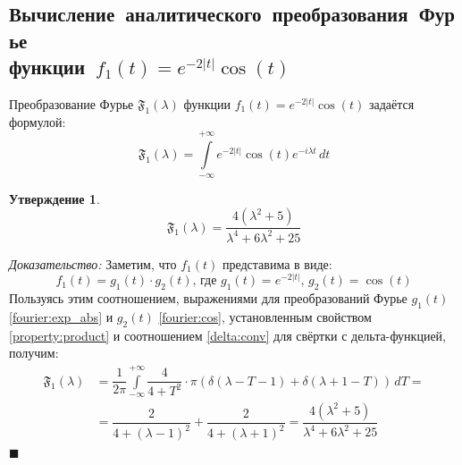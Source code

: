 \documentclass[11pt, oneside, final]{article}
\theoremstyle{break}
\numberwithin{equation}{section}
\theoremstyle{plain}
\newtheorem*{statement}{Утверждение}
\theoremstyle{definition}
\renewenvironment{proof}{
\noindent\textit{Доказательство: }} {\qed}
\newcommand \intinf[1][{\,dt}]{ \int\limits_{-\infty}^{+\infty}{{#1}}}
\renewcommand \qed{$\blacksquare$}
\begin{document}
   \clearpage
       \subsection{Вычисление~аналитического~преобразования~Фурье\\функции~\(f_1(t) = e^{-2|t|} \cos(t)\)}

       Преобразование Фурье \( \mathfrak{F_1} (\lambda)\) функции \(f_1(t) = e^{-2|t|} \cos(t) \) задаётся формулой:
       \[ \mathfrak{F_1} (\lambda) = \intinf[{e^{-2|t|} \cos(t) e^{-i\lambda t}\, dt}] \]
       \begin{statement}
           \begin{equation}\label{eq:fourier:f1} 
               \boxed{ \mathfrak{F_1}(\lambda) = \dfrac{4(\lambda^2 + 5)}{\lambda^4 + 6\lambda^2 + 25} } 
           \end{equation}
       \end{statement}
       \begin{proof}
           Заметим, что \(f_1(t) \) представима в виде: 
           \begin{equation}\label{factor:f1} 
               f_1(t) = g_1(t) \cdot g_2(t) \text{, где }g_1(t) = e^{-2|t|},\,g_2(t) = \cos(t) 
           \end{equation}
           Пользуясь этим соотношением, выражениями для преобразований Фурье \(g_1(t)\) \eqref{fourier:exp_abs} и \(g_2(t)\) \eqref{fourier:cos}, установленным свойством \ref{property:product} и соотношением \eqref{delta:conv} для свёртки с дельта-функцией, получим:
           \[ 
           \begin{split}
               \mathfrak{F_1} (\lambda) &= \dfrac{1}{2\pi} \intinf[{\dfrac{4}{4 + T^2} \cdot \pi(\delta(\lambda - T- 1) + \delta(\lambda + 1 - T))\,dT}] = \\
               &=\dfrac{2}{4 + (\lambda - 1)^2} + \dfrac{2}{4 + (\lambda + 1)^2} = \dfrac{4(\lambda^2 + 5)}{\lambda^4 + 6\lambda^2 + 25} 
           \end{split}
           \]
       \end{proof}
       \clearpage
\end{document}
